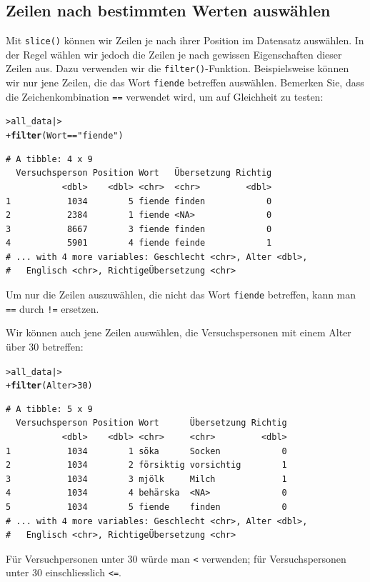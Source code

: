 \documentclass[oneside, 10pt]{book}\usepackage[]{graphicx}\usepackage[]{xcolor}
\makeatletter
\newcommand{\hlnum}[1]{\textcolor[rgb]{0.686,0.059,0.569}{#1}}%
\newcommand{\hlstr}[1]{\textcolor[rgb]{0.192,0.494,0.8}{#1}}%
\newcommand{\hlopt}[1]{\textcolor[rgb]{0,0,0}{#1}}%
\newcommand{\hlstd}[1]{\textcolor[rgb]{0.345,0.345,0.345}{#1}}%
\newcommand{\hlkwd}[1]{\textcolor[rgb]{0.737,0.353,0.396}{\textbf{#1}}}%
\newenvironment{kframe}{%
 \def\at@end@of@kframe{}%
 \ifinner\ifhmode%
  \def\at@end@of@kframe{\end{minipage}}%
  \begin{minipage}{\columnwidth}%
 \fi\fi%
 \def\FrameCommand##1{\hskip\@totalleftmargin \hskip-\fboxsep
 \colorbox{shadecolor}{##1}\hskip-\fboxsep
     \hskip-\linewidth \hskip-\@totalleftmargin \hskip\columnwidth}%
 \MakeFramed {\advance\hsize-\width
   \@totalleftmargin\z@ \linewidth\hsize
   \@setminipage}}%
 {\par\unskip\endMakeFramed%
 \at@end@of@kframe}
\newenvironment{knitrout}{}{} %
\makeatother
\begin{document}
\subsection{Zeilen nach bestimmten Werten auswählen}
Mit \texttt{slice()} können wir Zeilen je nach ihrer Position
im Datensatz auswählen. In der Regel wählen wir jedoch die Zeilen
je nach gewissen Eigenschaften dieser Zeilen aus. Dazu verwenden
wir die \texttt{filter()}-Funktion. Beispielsweise können
wir nur jene Zeilen, die das Wort \texttt{fiende} betreffen auswählen.
Bemerken Sie, dass die Zeichenkombination \texttt{==} verwendet wird,
um auf Gleichheit zu testen:
\begin{knitrout}
\color{fgcolor}\begin{kframe}
\begin{alltt}
\hlstd{> }\hlstd{all_data |>}
\hlstd{+ }  \hlkwd{filter}\hlstd{(Wort} \hlopt{==} \hlstr{"fiende"}\hlstd{)}
\end{alltt}
\begin{verbatim}
# A tibble: 4 x 9
  Versuchsperson Position Wort   Übersetzung Richtig
           <dbl>    <dbl> <chr>  <chr>         <dbl>
1           1034        5 fiende finden            0
2           2384        1 fiende <NA>              0
3           8667        3 fiende finden            0
4           5901        4 fiende feinde            1
# ... with 4 more variables: Geschlecht <chr>, Alter <dbl>,
#   Englisch <chr>, RichtigeÜbersetzung <chr>
\end{verbatim}
\end{kframe}
\end{knitrout}

Um nur die Zeilen auszuwählen, die nicht das Wort \texttt{fiende}
betreffen, kann man \texttt{==} durch \texttt{!=} ersetzen.

Wir können auch jene Zeilen auswählen, die Versuchspersonen
mit einem Alter über 30 betreffen:
\begin{knitrout}
\color{fgcolor}\begin{kframe}
\begin{alltt}
\hlstd{> }\hlstd{all_data |>}
\hlstd{+ }  \hlkwd{filter}\hlstd{(Alter} \hlopt{>} \hlnum{30}\hlstd{)}
\end{alltt}
\begin{verbatim}
# A tibble: 5 x 9
  Versuchsperson Position Wort      Übersetzung Richtig
           <dbl>    <dbl> <chr>     <chr>         <dbl>
1           1034        1 söka      Socken            0
2           1034        2 försiktig vorsichtig        1
3           1034        3 mjölk     Milch             1
4           1034        4 behärska  <NA>              0
5           1034        5 fiende    finden            0
# ... with 4 more variables: Geschlecht <chr>, Alter <dbl>,
#   Englisch <chr>, RichtigeÜbersetzung <chr>
\end{verbatim}
\end{kframe}
\end{knitrout}
Für Versuchpersonen unter 30 würde man \texttt{<} verwenden;
für Versuchspersonen unter 30 einschliesslich \texttt{<=}.
\end{document}

